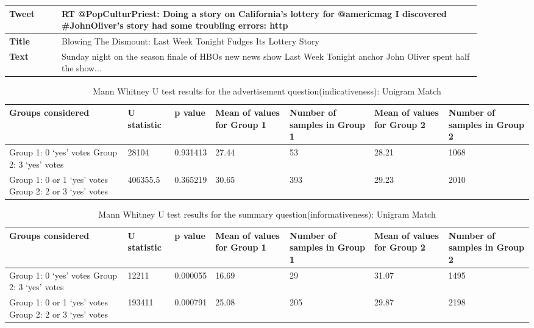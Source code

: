 \begin{table}[!t]
\centering
\begin{tabular}{|p{0.1\linewidth}|p{0.8\linewidth}|}
\hline
\textbf{Tweet} & RT @PopCulturPriest: Doing a story on California's lottery for @americmag I discovered \#JohnOliver's story had some troubling errors: http \\ \hline
\textbf{Title} & Blowing The Dismount: Last Week Tonight Fudges Its Lottery Story \\ \hline
\textbf{Text}  & Sunday night on the season finale of HBOs new news show Last Week Tonight anchor John Oliver spent half the show... \\ \hline
\end{tabular}
\label{tab:exq2yes}
\end{table}

\begin{table}[!htbp]
\centering
\begin{tabular}{|p{}|p{}|p{}|p{}|p{}|p{}|p{}|}
\hline
\textbf{Groups considered}    & \textbf{U statistic} & \textbf{p value} & \textbf{Mean of values for Group 1} & \textbf{Number of samples in Group 1} & \textbf{Mean of values for Group 2} & \textbf{Number of samples in Group 2} \\ \hline
Group 1: 0 `yes' votes \newline Group 2: 3 `yes' votes &  28104  &  0.931413  &  27.44  & 53 & 28.21 &   1068  \\ \hline
Group 1: 0 or 1 `yes' votes \newline Group 2: 2 or 3 `yes' votes &   406355.5  & 0.365219 & 30.65  & 393 & 29.23 & 2010 \\ \hline
\end{tabular}
\caption{Mann Whitney U test results for the advertisement question(indicativeness): Unigram Match}
\label{tab:unicorr1}
\end{table}

\begin{table}[!htbp]
\centering
\begin{tabular}{|p{}|p{}|p{}|p{}|p{}|p{}|p{}|}
\hline
\textbf{Groups considered}    & \textbf{U statistic} & \textbf{p value} & \textbf{Mean of values for Group 1} & \textbf{Number of samples in Group 1} & \textbf{Mean of values for Group 2} & \textbf{Number of samples in Group 2}\\ \hline
Group 1: 0 `yes' votes \newline Group 2: 3 `yes' votes & 12211 & 0.000055  & 16.69 & 29 & 31.07 & 1495  \\ \hline
Group 1: 0 or 1 `yes' votes \newline Group 2: 2 or 3 `yes' votes & 193411 & 0.000791 & 25.08 & 205 & 29.87 & 2198 \\ \hline
\end{tabular}
\caption{Mann Whitney U test results for the summary question(informativeness): Unigram Match}
\label{tab:unicorr2}
\end{table}

